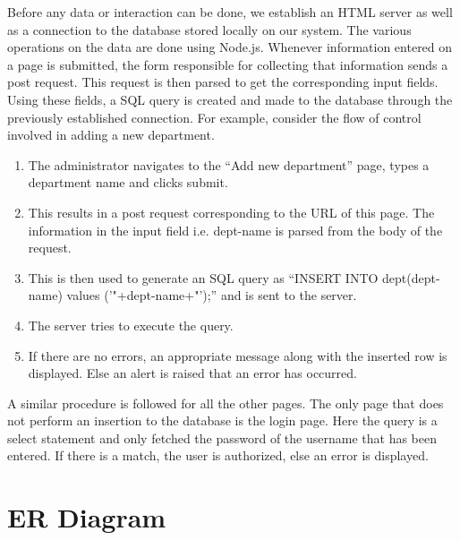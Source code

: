 \documentclass[12pt]{article}
\begin{document}
Before any data or interaction can be done, we establish an HTML server as well as a connection to the database stored locally on our system. 
\newline
\newline
The various operations on the data are done using Node.js. Whenever information entered on a page is submitted, the form responsible for collecting that information sends a post request. This request is then parsed to get the corresponding input fields. Using these fields, a SQL query is created and made to the database through the previously established connection.
\newline
\newline
For example, consider the flow of control involved in adding a new department. 
\begin{enumerate}
    \item The administrator navigates to the “Add new department” page, types a department name and clicks submit.
    \item This results in a post request corresponding to the URL of this page. The information in the input field i.e. dept-name is parsed from the body of the request.
    \item This is then used to generate an SQL query as “INSERT INTO dept(dept-name) values ('"+dept-name+"');” and is sent to the server.
    \item The server tries to execute the query.
    \item If there are no errors, an appropriate message along with the inserted row is displayed. Else an alert is raised that an error has occurred.
\end{enumerate}
A similar procedure is followed for all the other pages. The only page that does not perform an insertion to the database is the login page. Here the query is a select statement and only fetched the password of the username that has been entered. If there is a match, the user is authorized, else an error is displayed.


\newpage                %
\section{ER Diagram}    %
\end{document}
